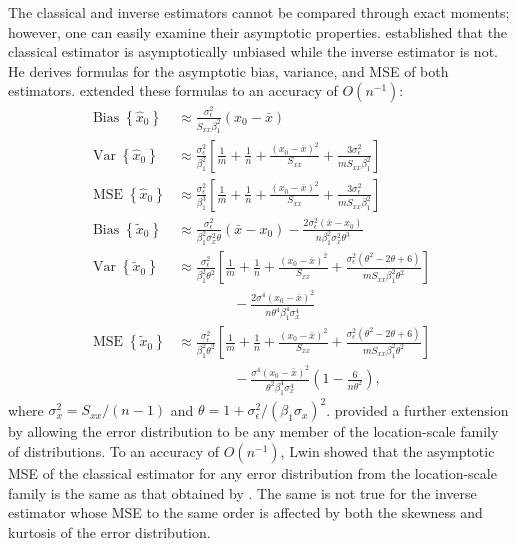\documentclass[cmfont,usenames,dvipsnames,leqno]{afit-etd}\usepackage[]{graphicx}\usepackage[]{color}
\newcommand{\newln}{\\&\quad\quad\quad\quad{}}
\newcommand{\wh}[1]{\ensuremath{\widehat{#1}}}
\newcommand{\wt}[1]{\ensuremath{\widetilde{#1}}}
\newcommand{\var}{\operatorname{Var}}
\newcommand{\bias}{\operatorname{Bias}}
\newcommand{\MSE}{\operatorname{MSE}}
\begin{document}
The classical and inverse estimators cannot be compared through exact moments; however, one can easily examine their asymptotic properties. \citet{berkson_estimation_1969} established that the classical estimator is asymptotically unbiased while the inverse estimator is not. He derives formulas for the asymptotic bias, variance, and \ac{MSE} of both estimators. \citet{shukla_problem_1972} extended these formulas to an accuracy of $O(n^{-1})$:
\begin{align*}
  \bias\left\{\wh{x}_0\right\} &\approx \frac{\sigma_\epsilon^2}{S_{xx}\beta_1^2}(x_0 - \bar{x}) \\
  \var\left\{\wh{x}_0\right\} &\approx \frac{\sigma_\epsilon^2}{\beta_1^2}\left[ \frac{1}{m} + \frac{1}{n} + \frac{(x_0 - \bar{x})^2}{S_{xx}} + \frac{3\sigma_\epsilon^2}{m S_{xx} \beta_1^2} \right] \\
  \MSE\left\{\wh{x}_0\right\} &\approx \frac{\sigma_\epsilon^2}{\beta_1^3}\left[ \frac{1}{m} + \frac{1}{n} + \frac{(x_0 - \bar{x})^2}{S_{xx}} + \frac{3\sigma_\epsilon^2}{m S_{xx} \beta_1^2} \right] \\
  \bias\left\{\wt{x}_0\right\} &\approx \frac{\sigma_\epsilon^2}{\beta_1^2\sigma_x^2\theta}(\bar{x}-x_0) - \frac{2\sigma_\epsilon^2(\bar{x}-x_0)}{n\beta_1^2\sigma_x^2\theta^3} \\
  \var\left\{\wt{x}_0\right\} &\approx \frac{\sigma_\epsilon^2}{\beta_1^2\theta^2}\left[ \frac{1}{m} + \frac{1}{n} + \frac{(x_0 - \bar{x})^2}{S_{xx}} + \frac{\sigma_\epsilon^2(\theta^2-2\theta+6)}{m S_{xx}\beta_1^2\theta^2} \right] \newln - \frac{2\sigma^4(x_0-\bar{x})^2}{n\theta^4\beta_1^4\sigma_x^4} \\
  \MSE\left\{\wt{x}_0\right\} &\approx \frac{\sigma_\epsilon^2}{\beta_1^2\theta^2}\left[ \frac{1}{m} + \frac{1}{n} + \frac{(x_0 - \bar{x})^2}{S_{xx}} + \frac{\sigma_\epsilon^2(\theta^2-2\theta+6)}{m S_{xx}\beta_1^2\theta^2} \right] \newln - \frac{\sigma^4(x_0-\bar{x})^2}{\theta^2\beta_1^4\sigma_x^4}\left(1-\frac{6}{n\theta^2}\right),
\end{align*}
where $\sigma_x^2 = S_{xx}/(n-1)$ and $\theta = 1 + \sigma_\epsilon^2/(\beta_1\sigma_x)^2$. \citet{lwin_discussion_1981} provided a further extension by allowing the error distribution to be any member of the location-scale family of distributions. To an accuracy of $O(n^{-1})$, Lwin showed that the asymptotic \ac{MSE} of the classical estimator for any error distribution from the location-scale family is the same as that obtained by \citet{shukla_problem_1972}. The same is not true for the inverse estimator whose \ac{MSE} to the same order is affected by both the skewness and kurtosis of the error distribution.
\end{document}
